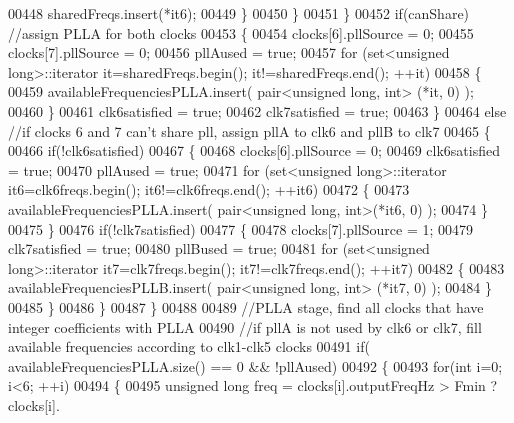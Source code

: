 \begin{DoxyCode}
{00448                     sharedFreqs.insert(*it6);
00449                 \}
00450             \}
00451         \}
00452         \textcolor{keywordflow}{if}(canShare) \textcolor{comment}{//assign PLLA for both clocks}
00453         \{
00454             clocks[6].pllSource = 0;
00455             clocks[7].pllSource = 0;
00456             pllAused = \textcolor{keyword}{true};
00457             \textcolor{keywordflow}{for} (set<unsigned long>::iterator it=sharedFreqs.begin(); it!=sharedFreqs.end(); ++it)
00458             \{
00459                 availableFrequenciesPLLA.insert( pair<unsigned long, int> (*it, 0) );
00460             \}
00461             clk6satisfied = \textcolor{keyword}{true};
00462             clk7satisfied = \textcolor{keyword}{true};
00463         \}
00464         \textcolor{keywordflow}{else} \textcolor{comment}{//if clocks 6 and 7 can't share pll, assign pllA to clk6 and pllB to clk7}
00465         \{
00466             \textcolor{keywordflow}{if}(!clk6satisfied)
00467             \{
00468                 clocks[6].pllSource = 0;
00469                 clk6satisfied = \textcolor{keyword}{true};
00470                 pllAused = \textcolor{keyword}{true};
00471                 \textcolor{keywordflow}{for} (set<unsigned long>::iterator it6=clk6freqs.begin(); it6!=clk6freqs.end(); ++it6)
00472                 \{
00473                     availableFrequenciesPLLA.insert( pair<unsigned long, int>(*it6, 0) );
00474                 \}
00475             \}
00476             \textcolor{keywordflow}{if}(!clk7satisfied)
00477             \{
00478                 clocks[7].pllSource = 1;
00479                 clk7satisfied = \textcolor{keyword}{true};
00480                 pllBused = \textcolor{keyword}{true};
00481                 \textcolor{keywordflow}{for} (set<unsigned long>::iterator it7=clk7freqs.begin(); it7!=clk7freqs.end(); ++it7)
00482                 \{
00483                     availableFrequenciesPLLB.insert( pair<unsigned long, int> (*it7, 0) );
00484                 \}
00485             \}
00486         \}
00487     \}
00488 
00489     \textcolor{comment}{//PLLA stage, find  all clocks that have integer coefficients with PLLA}
00490     \textcolor{comment}{//if pllA is not used by clk6 or clk7, fill available frequencies according to clk1-clk5 clocks}
00491     \textcolor{keywordflow}{if}( availableFrequenciesPLLA.size() == 0 && !pllAused)
00492     \{
00493         \textcolor{keywordflow}{for}(\textcolor{keywordtype}{int} i=0; i<6; ++i)
00494         \{
00495             \textcolor{keywordtype}{unsigned} \textcolor{keywordtype}{long} freq = clocks[i].outputFreqHz > Fmin ? clocks[i].
}
\end{DoxyCode}
